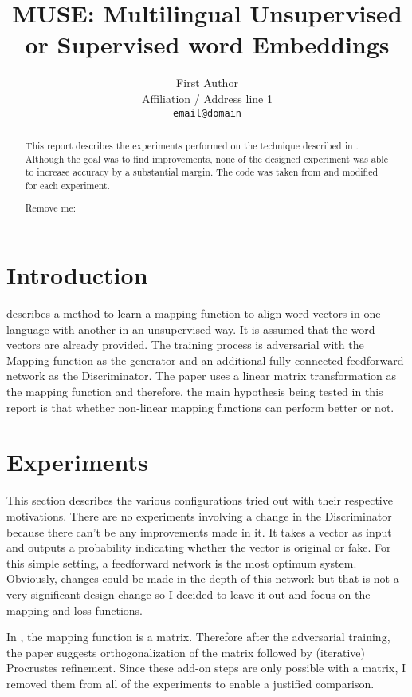 \documentclass[11pt]{article}
\title{MUSE: Multilingual Unsupervised or Supervised word Embeddings}
\author{First Author \\
  Affiliation / Address line 1 \\
  {\tt email@domain}}
\date{}
\begin{document}
\maketitle
\begin{abstract}
This report describes the experiments performed on the technique described in \cite{conneau2017word}. Although the goal was to find improvements, none of the designed experiment was able to increase accuracy by a substantial margin. The code was taken from \cite{muserepo} and modified for each experiment.

Remove me: \cite{lample2017unsupervised}

\end{abstract}

\section{Introduction}
\cite{conneau2017word} describes a method to learn a mapping function to align word vectors in one language with another in an unsupervised way. It is assumed that the word vectors are already provided. The training process is adversarial with the Mapping function as the generator and an additional fully connected feedforward network as the Discriminator. The paper uses a linear matrix transformation as the mapping function and therefore, the main hypothesis being tested in this report is that whether non-linear mapping functions can perform better or not.

\section{Experiments}
This section describes the various configurations tried out with their respective motivations. There are no experiments involving a change in the Discriminator because there can't be any improvements made in it. It takes a vector as input and outputs a probability indicating whether the vector is original or fake. For this simple setting, a feedforward network is the most optimum system. Obviously, changes could be made in the depth of this network but that is not a very significant design change so I decided to leave it out and focus on the mapping and loss functions.

In \cite{conneau2017word}, the mapping function is a matrix. Therefore after the adversarial training, the paper suggests orthogonalization of the matrix followed by (iterative) Procrustes refinement. Since these add-on steps are only possible with a matrix, I removed them from all of the experiments to enable a justified comparison.
\end{document}

